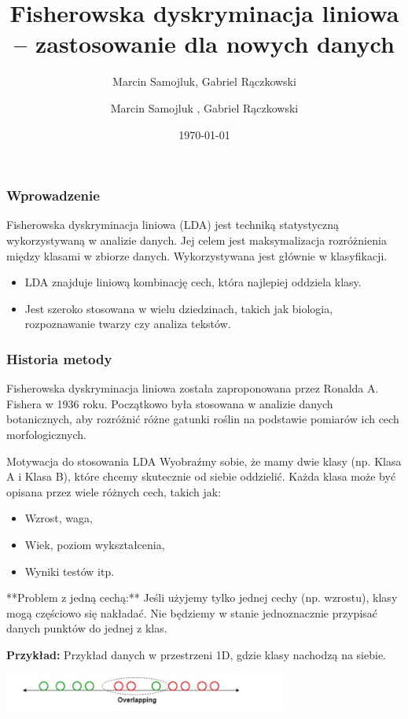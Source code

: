 \documentclass{beamer}
\title{Fisherowska dyskryminacja liniowa – zastosowanie dla nowych danych}
\author{Marcin Samojluk, Gabriel Rączkowski}
\author{Marcin Samojluk , Gabriel Rączkowski}
\date{\today}
\begin{document}
\begin{frame}
    \titlepage
\end{frame}

\begin{frame}
    \frametitle{Wprowadzenie}
    Fisherowska dyskryminacja liniowa (LDA) jest techniką statystyczną wykorzystywaną w analizie danych. Jej celem jest maksymalizacja rozróżnienia między klasami w zbiorze danych. Wykorzystywana jest głównie w klasyfikacji.
    \begin{itemize}
        \item LDA znajduje liniową kombinację cech, która najlepiej oddziela klasy.
        \item Jest szeroko stosowana w wielu dziedzinach, takich jak biologia, rozpoznawanie twarzy czy analiza tekstów.
    \end{itemize}
\end{frame}

\begin{frame}
    \frametitle{Historia metody}
    Fisherowska dyskryminacja liniowa została zaproponowana przez Ronalda A. Fishera w 1936 roku. Początkowo była stosowana w analizie danych botanicznych, aby rozróżnić różne gatunki roślin na podstawie pomiarów ich cech morfologicznych.
\end{frame}





\begin{frame}{Motywacja do stosowania LDA}
    Wyobraźmy sobie, że mamy dwie klasy (np. Klasa A i Klasa B), które chcemy skutecznie od siebie oddzielić. Każda klasa może być opisana przez wiele różnych cech, takich jak:
    \begin{itemize}
        \item Wzrost, waga,
        \item Wiek, poziom wykształcenia,
        \item Wyniki testów itp.
    \end{itemize}
    
    \bigskip
    **Problem z jedną cechą:** Jeśli użyjemy tylko jednej cechy (np. wzrostu), klasy mogą częściowo się nakładać. Nie będziemy w stanie jednoznacznie przypisać danych punktów do jednej z klas.

    \bigskip
    \textbf{Przykład:} Przykład danych w przestrzeni 1D, gdzie klasy nachodzą na siebie.
    
    \bigskip
    \includegraphics[width=0.7\textwidth]{overlapping.png} 
\end{frame}
\end{document}
